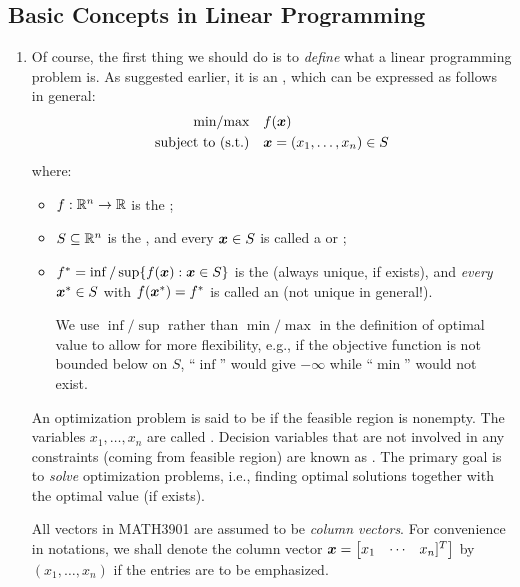 \subsection{Basic Concepts in Linear Programming}
\label{subsect:lp-basic-cocnepts}
\begin{enumerate}
\item Of course, the first thing we should do is to \emph{define} what a linear
programming problem is. As suggested earlier, it is an , which can be expressed as follows in general:
\begin{align*}
\text{min/max}\quad&f(\bm{x}) \\
\text{subject to (s.t.)}\quad&\bm{x}=(x_1,\dotsc,x_n)\in S
\end{align*}
where:
\begin{itemize}
\item \(f:\mathbb{R}^n\to\mathbb{R}\) is the ;
\item \(S\subseteq \mathbb{R}^n\) is the , and every \(\bm{x}\in S\) is called a  or ;
\item \(f^*=\inf/\sup\{f(\bm{x}):\bm{x}\in S\}\) is the  (always unique, if exists), and \emph{every}
\(\bm{x}^{*}\in S\) with \(f(\bm{x}^{*})=f^{*}\) is called an
 (not unique in general!).
\begin{note}
We use \(\inf/\sup\) rather than \(\min/\max\) in the definition of optimal
value to allow for more flexibility, e.g., if the objective function is not
bounded below on \(S\), ``\(\inf\)'' would give \(-\infty\) while ``\(\min\)''
would not exist.
\end{note}
\end{itemize}
An optimization problem is said to be  if the feasible region is
nonempty. The variables \(x_1,\dotsc,x_n\) are called .  Decision variables that are not involved in any constraints
(coming from feasible region) are known as . The primary
goal is to \emph{solve} optimization problems, i.e., finding optimal solutions
together with the optimal value (if exists).

All vectors in MATH3901 are assumed to be \emph{column
vectors}. For convenience in notations, we shall denote the column vector \(\bm{x}=
\begin{bmatrix}x_1&\cdots&x_n]^{T}\end{bmatrix}\) by \((x_1,\dotsc,x_n)\) if
the entries are to be emphasized.


\end{enumerate}
